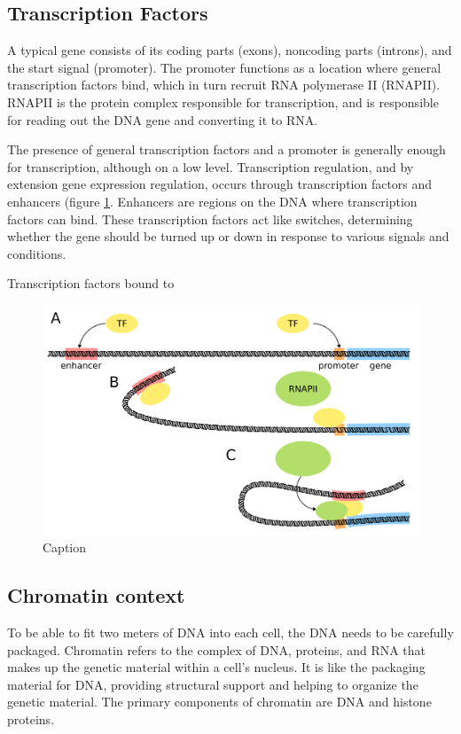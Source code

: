 \subsection{Transcription Factors}

A typical gene consists of its coding parts (exons), noncoding parts (introns), and the start signal (promoter). The promoter functions as a location where general transcription factors bind, which in turn recruit RNA polymerase II (RNAPII). RNAPII is the protein complex responsible for transcription, and is responsible for reading out the DNA gene and converting it to RNA.

The presence of general transcription factors and a promoter is generally enough for transcription, although on a low level\cite{Haberle2018}. Transcription regulation, and by extension gene expression regulation, occurs through transcription factors and enhancers (figure \ref{fig:TF}. Enhancers are regions on the DNA where transcription factors can bind. These transcription factors act like switches, determining whether the gene should be turned up or down in response to various signals and conditions.

Transcription factors bound to 

\begin{figure}[H]
    \center
    \includegraphics[width=0.65\linewidth]{ch.introduction/imgs/transcription_factor.png}
    \caption{Caption}
    \label{fig:TF}
\end{figure}

\subsection{Chromatin context}

To be able to fit two meters of DNA into each cell, the DNA needs to be carefully packaged. Chromatin refers to the complex of DNA, proteins, and RNA that makes up the genetic material within a cell's nucleus. It is like the packaging material for DNA, providing structural support and helping to organize the genetic material. The primary components of chromatin are DNA and histone proteins.

